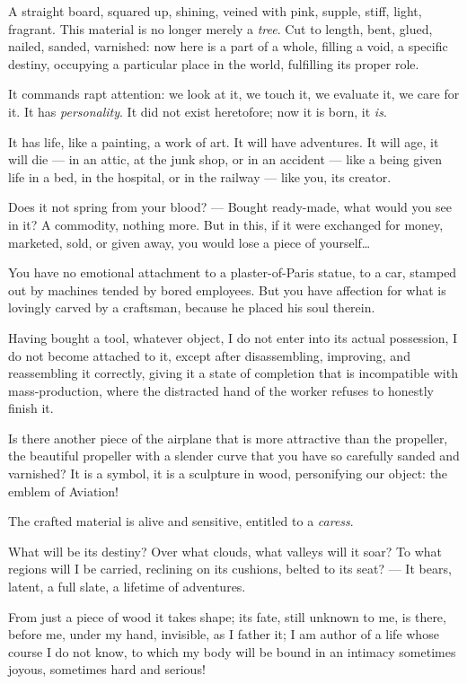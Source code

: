 \documentclass{book}
\begin{document}
A straight board, squared up, shining, veined with pink, supple,
stiff, light, fragrant. This material is no longer merely a
\emph{tree}.  Cut to length, bent, glued, nailed, sanded, varnished:
now here is a part of a whole, filling a void, a specific destiny,
occupying a particular place in the world, fulfilling its proper role.

It commands rapt attention: we look at it, we touch it, we evaluate
it, we care for it. It has \textit{personality}. It did not exist
heretofore; now it is born, it \textit{is}.

It has life, like a painting, a work of art. It will have adventures.
It will age, it will die --- in an attic, at the junk shop, or in an
accident --- like a being given life in a bed, in the hospital, or in
the railway --- like you, its creator.

Does it not spring from your blood? --- Bought ready-made, what would
you see in it?  A commodity, nothing more.  But in this, if it were
exchanged for money, marketed, sold, or given away, you would lose a
piece of yourself\ldots

You have no emotional attachment to a plaster-of-Paris statue, to a
car, stamped out by machines tended by bored employees. But you have
affection for what is lovingly carved by a craftsman, because he
placed his soul therein.

Having bought a tool, whatever object, I do not enter into its actual
possession, I do not become attached to it, except after
disassembling, improving, and reassembling it correctly, giving it a
state of completion that is incompatible with mass-production, where
the distracted hand of the worker refuses to honestly finish it.

Is there another piece of the airplane that is more attractive than
the propeller, the beautiful propeller with a slender curve that you
have so carefully sanded and varnished?  It is a symbol, it is a
sculpture in wood, personifying our object: the emblem of Aviation!

The crafted material is alive and sensitive, entitled to a
\textit{caress}.

What will be its destiny? Over what clouds, what valleys will it soar?
To what regions will I be carried, reclining on its cushions, belted
to its seat? --- It bears, latent, a full slate, a lifetime of
adventures.

From just a piece of wood it takes shape; its fate, still unknown to
me, is there, before me, under my hand, invisible, as I father it; I
am author of a life whose course I do not know, to which my body will
be bound in an intimacy sometimes joyous, sometimes hard and serious!
\end{document}
